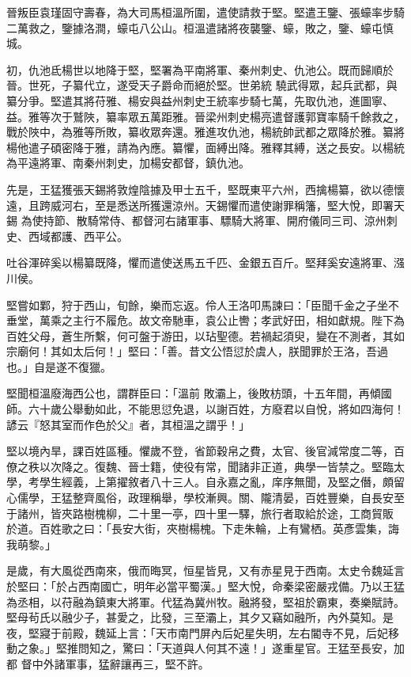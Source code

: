 \begin{pinyinscope}
 晉叛臣袁瑾固守壽春，為大司馬桓溫所圍，遣使請救于堅。堅遣王鑒、張蠔率步騎二萬救之，鑒據洛澗，蠔屯八公山。桓溫遣諸將夜襲鑒、蠔，敗之，鑒、蠔屯慎城。



 初，仇池氐楊世以地降于堅，堅署為平南將軍、秦州刺史、仇池公。既而歸順於晉。世死，子纂代立，遂受天子爵命而絕於堅。世弟統
 驍武得眾，起兵武都，與纂分爭。堅遣其將苻雅、楊安與益州刺史王統率步騎七萬，先取仇池，進圖寧、益。雅等次于鷲陜，纂率眾五萬距雅。晉梁州刺史楊亮遣督護郭寶率騎千餘救之，戰於陜中，為雅等所敗，纂收眾奔還。雅進攻仇池，楊統帥武都之眾降於雅。纂將楊他遣子碩密降于雅，請為內應。纂懼，面縛出降。雅釋其縛，送之長安。以楊統為平遠將軍、南秦州刺史，加楊安都督，鎮仇池。



 先是，王猛獲張天錫將敦煌陰據及甲士五千，堅既東平六州，西擒楊纂，欲以德懷遠，且跨威河右，至是悉送所獲還涼州。天錫懼而遣使謝罪稱籓，堅大悅，即署天錫
 為使持節、散騎常侍、都督河右諸軍事、驃騎大將軍、開府儀同三司、涼州刺史、西域都護、西平公。



 吐谷渾碎奚以楊纂既降，懼而遣使送馬五千匹、金銀五百斤。堅拜奚安遠將軍、漒川侯。



 堅嘗如鄴，狩于西山，旬餘，樂而忘返。伶人王洛叩馬諫曰：「臣聞千金之子坐不垂堂，萬乘之主行不履危。故文帝馳車，袁公止轡；孝武好田，相如獻規。陛下為百姓父母，蒼生所繫，何可盤于游田，以玷聖德。若禍起須臾，變在不測者，其如宗廟何！其如太后何！」堅曰：「善。昔文公悟愆於虞人，朕聞罪於王洛，吾過也。」自是遂不復獵。



 堅聞桓溫廢海西公也，謂群臣曰：「溫前
 敗灞上，後敗枋頭，十五年間，再傾國師。六十歲公舉動如此，不能思愆免退，以謝百姓，方廢君以自悅，將如四海何！諺云『怒其室而作色於父』者，其桓溫之謂乎！」



 堅以境內旱，課百姓區種。懼歲不登，省節穀帛之費，太官、後官減常度二等，百僚之秩以次降之。復魏、晉士籍，使役有常，聞諸非正道，典學一皆禁之。堅臨太學，考學生經義，上第擢敘者八十三人。自永嘉之亂，庠序無聞，及堅之僭，頗留心儒學，王猛整齊風俗，政理稱舉，學校漸興。關、隴清晏，百姓豐樂，自長安至于諸州，皆夾路樹槐柳，二十里一亭，四十里一驛，旅行者取給於途，工商貿販
 於道。百姓歌之曰：「長安大街，夾樹楊槐。下走朱輪，上有鸞栖。英彥雲集，誨我萌黎。」



 是歲，有大風從西南來，俄而晦冥，恒星皆見，又有赤星見于西南。太史令魏延言於堅曰：「於占西南國亡，明年必當平蜀漢。」堅大悅，命秦梁密嚴戎備。乃以王猛為丞相，以苻融為鎮東大將軍。代猛為冀州牧。融將發，堅祖於霸東，奏樂賦詩。堅母茍氏以融少子，甚愛之，比發，三至灞上，其夕又竊如融所，內外莫知。是夜，堅寢于前殿，魏延上言：「天市南門屏內后妃星失明，左右閽寺不見，后妃移動之象。」堅推問知之，驚曰：「天道與人何其不遠！」遂重星官。王猛至長安，加都
 督中外諸軍事，猛辭讓再三，堅不許。




\end{pinyinscope}
